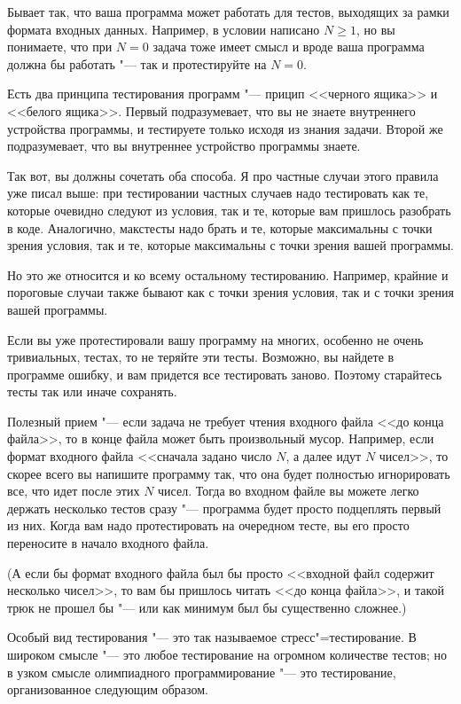\documentclass[a4paper,10pt]{problems}
\begin{document}
Бывает так, что ваша программа может работать для тестов, выходящих за рамки формата входных данных.
Например, в условии написано $N\geq 1$, но вы понимаете, что при $N=0$ задача тоже имеет смысл и вроде ваша программа должна бы работать "---
так и протестируйте на $N=0$. 

 Есть два принципа тестирования программ "--- прицип <<черного ящика>> и <<белого ящика>>. 
Первый подразумевает, что вы не знаете внутреннего устройства программы, и тестируете только исходя из знания задачи. 
Второй же подразумевает, что вы внутреннее устройство программы знаете.

Так вот, вы должны сочетать оба способа. 
Я про частные случаи этого правила уже писал выше: при тестировании частных случаев надо тестировать как те, которые очевидно следуют из условия,
так и те, которые вам пришлось разобрать в коде.
Аналогично, макстесты надо брать и те, которые максимальны с точки зрения условия, так и те, которые максимальны с точки зрения вашей программы.

Но это же относится и ко всему остальному тестированию. 
Например, крайние и пороговые случаи также бывают как с точки зрения условия, так и с точки зрения вашей программы.

 Если вы уже протестировали вашу программу на многих, особенно не очень тривиальных, тестах, то не теряйте эти тесты. 
Возможно, вы найдете в программе ошибку, и вам придется все тестировать заново. Поэтому старайтесь тесты так или иначе сохранять.

Полезный прием "--- если задача не требует чтения входного файла <<до конца файла>>, то в конце файла может быть произвольный мусор. 
Например, если формат входного файла <<сначала задано число $N$, а далее идут $N$ чисел>>, то скорее всего вы напишите программу так, 
что она будет полностью игнорировать все, что идет после этих $N$ чисел. 
Тогда во входном файле вы можете легко держать несколько тестов сразу "--- программа будет просто подцеплять первый из них. 
Когда вам надо протестировать на очередном тесте, вы его просто переносите в начало входного файла.

(А если бы формат входного файла был бы просто <<входной файл содержит несколько чисел>>, то вам бы пришлось читать <<до конца файла>>, и такой трюк не прошел бы
"--- или как минимум был бы существенно сложнее.)

Особый вид тестирования "--- это так называемое стресс"=тестирование. В широком смысле "--- это любое тестирование на огромном количестве тестов; но в узком смысле олимпиадного программирование "--- это тестирование, организованное следующим образом.
\end{document}
